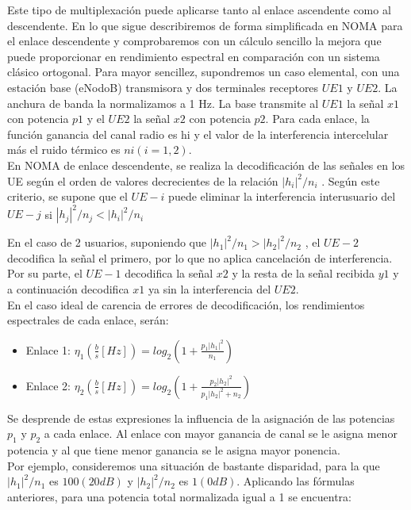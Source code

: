 \documentclass[]{article}
\begin{document}
Este tipo de multiplexación puede aplicarse tanto al enlace ascendente como al descendente. 
En lo que sigue describiremos de forma simplificada en NOMA para el enlace descendente y comprobaremos con un cálculo sencillo la mejora que puede proporcionar en rendimiento espectral en comparación con un sistema clásico ortogonal. 
Para mayor sencillez, supondremos un caso elemental, con una estación base (eNodoB) transmisora y dos terminales receptores $UE1$ y $UE2$. La anchura de banda la normalizamos a 1 Hz. La base transmite al $UE1$ la señal $x1$ con potencia $p1$ y el $UE2$ la señal $x2$ con potencia $p2$. Para cada enlace, la función ganancia del canal radio es hi y el valor de la interferencia intercelular más el ruido térmico es $ni (i=1, 2)$.\\
 
En NOMA de enlace descendente, se realiza la decodificación de las señales en los UE según el orden de valores decrecientes de la relación $|h_i |^2/n_i$ . Según este criterio, se supone que el $UE-i$ puede eliminar la interferencia interusuario del $UE-j$ si $|h_j |^ 2 /n_j < |h_i |^2/n_i$
 
En el caso de 2 usuarios, suponiendo que $|h_1 |^ 2/n_1 > |h_2 |^2/n_2$ , el $UE-2$ decodifica la señal el primero, por lo que no aplica cancelación de interferencia. Por su parte, el $UE-1$ decodifica la señal $x2$ y la resta de la señal recibida $y1$ y a continuación decodifica $x1$ ya sin la interferencia del $UE2$.\\

En el caso ideal de carencia de errores de decodificación, los rendimientos espectrales de cada enlace, serán:\\

\begin{itemize}
	\item Enlace 1: $\eta_1(\frac{b}{s}[Hz])=log_2(1+\frac{p_1|h_1|^ 2}{n_1})$
	\item Enlace 2: $\eta_2(\frac{b}{s}[Hz])=log_2(1+\frac{p_2|h_2|^ 2}{p_1|h_2|^ 2+n_2})$
\end{itemize}

Se desprende de estas expresiones la influencia de la asignación de las potencias $p_1$ y $p_2$ a cada enlace. Al enlace con mayor ganancia de canal se le asigna menor potencia y al que tiene menor ganancia se le asigna mayor ponencia.\\

Por ejemplo, consideremos una situación de bastante disparidad, para la que $|h_1 |^2/n_1$ es $100 (20 dB)$ y $|h_2 |^2/n_2$ es $1 (0dB)$. Aplicando las fórmulas anteriores, para una potencia total normalizada igual a 1 se encuentra:\\
\end{document}
